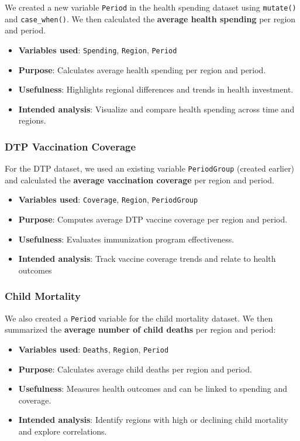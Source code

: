 \documentclass[
]{article}
\providecommand{\tightlist}{%
  \setlength{\itemsep}{0pt}\setlength{\parskip}{0pt}}
\begin{document}
We created a new variable \texttt{Period} in the health spending dataset
using \texttt{mutate()} and \texttt{case\_when()}. We then calculated
the \textbf{average health spending} per region and period.

\begin{itemize}
\tightlist
\item
  \textbf{Variables used}: \texttt{Spending}, \texttt{Region},
  \texttt{Period}~
\item
  \textbf{Purpose}: Calculates average health spending per region and
  period.~
\item
  \textbf{Usefulness}: Highlights regional differences and trends in
  health investment.~
\item
  \textbf{Intended analysis}: Visualize and compare health spending
  across time and regions.
\end{itemize}

\subsubsection{DTP Vaccination Coverage}\label{dtp-vaccination-coverage}

For the DTP dataset, we used an existing variable \texttt{PeriodGroup}
(created earlier) and calculated the \textbf{average vaccination
coverage} per region and period.

\begin{itemize}
\tightlist
\item
  \textbf{Variables used}: \texttt{Coverage}, \texttt{Region},
  \texttt{PeriodGroup}~
\item
  \textbf{Purpose}: Computes average DTP vaccine coverage per region and
  period.~
\item
  \textbf{Usefulness}: Evaluates immunization program effectiveness.~
\item
  \textbf{Intended analysis}: Track vaccine coverage trends and relate
  to health outcomes
\end{itemize}

\subsubsection{Child Mortality}\label{child-mortality}

We also created a \texttt{Period} variable for the child mortality
dataset. We then summarized the \textbf{average number of child deaths}
per region and period:

\begin{itemize}
\tightlist
\item
  \textbf{Variables used}: \texttt{Deaths}, \texttt{Region},
  \texttt{Period}\\
\item
  \textbf{Purpose}: Calculates average child deaths per region and
  period.\\
\item
  \textbf{Usefulness}: Measures health outcomes and can be linked to
  spending and coverage.\\
\item
  \textbf{Intended analysis}: Identify regions with high or declining
  child mortality and explore correlations.
\end{itemize}
\end{document}
